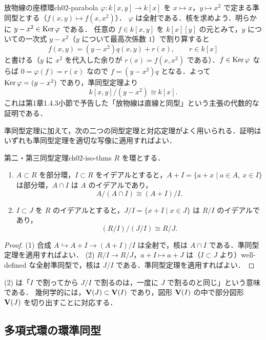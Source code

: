 \begin{myex}{放物線の座標環}{ch02-parabola}
$\varphi:k[x,y]\to k[x]$ を $x\mapsto x$，$y\mapsto x^2$ で定まる準同型とする（$f(x,y)\mapsto f(x,x^2)$）．
$\varphi$ は全射である．核を求めよう．明らかに $y-x^2\in\operatorname{Ker}\varphi$ である．
任意の $f\in k[x,y]$ を $k[x][y]$ の元とみて，$y$ についての一次式 $y-x^2$（$y$ について最高次係数 $1$）で割り算すると
\[
  f(x,y)=(y-x^2)q(x,y)+r(x),\qquad r\in k[x]
\]
と書ける（$y$ に $x^2$ を代入した余りが $r(x)=f(x,x^2)$ である）．$f\in\operatorname{Ker}\varphi$ ならば $0=\varphi(f)=r(x)$ なので
$f=(y-x^2)q$ となる．よって $\operatorname{Ker}\varphi=(y-x^2)$ であり，準同型定理より
\[
  k[x,y]/(y-x^2)\cong k[x].
\]
これは第1章1.4.3小節で予告した「放物線は直線と同型」という主張の代数的な証明である．
\end{myex}

準同型定理に加えて，次の二つの同型定理と対応定理がよく用いられる．証明はいずれも準同型定理を適切な写像に適用すればよい．

\begin{mythm}{第二・第三同型定理}{ch02-iso-thms}
$R$ を環とする．
\begin{enumerate}
  \item $A\subset R$ を部分環，$I\subset R$ をイデアルとすると，$A+I=\{a+x\mid a\in A,\ x\in I\}$ は部分環，$A\cap I$ は $A$ のイデアルであり，
        \[
          A/(A\cap I)\cong(A+I)/I.
        \]
  \item $I\subset J$ を $R$ のイデアルとすると，$J/I=\{x+I\mid x\in J\}$ は $R/I$ のイデアルであり，
        \[
          (R/I)\big/(J/I)\cong R/J.
        \]
\end{enumerate}
\end{mythm}

\begin{proof}
(1) 合成 $A\hookrightarrow A+I\to(A+I)/I$ は全射で，核は $A\cap I$ である．準同型定理を適用すればよい．
(2) $R/I\to R/J$，$a+I\mapsto a+J$ は（$I\subset J$ より）well-defined な全射準同型で，核は $J/I$ である．準同型定理を適用すればよい．
\end{proof}

(2) は「$I$ で割ってから $J/I$ で割るのは，一度に $J$ で割るのと同じ」という意味である．
幾何学的には，$\mathbf{V}(J)\subset\mathbf{V}(I)$ であり，図形 $\mathbf{V}(I)$ の中で部分図形 $\mathbf{V}(J)$ を切り出すことに対応する．

\subsection{多項式環の環準同型}

